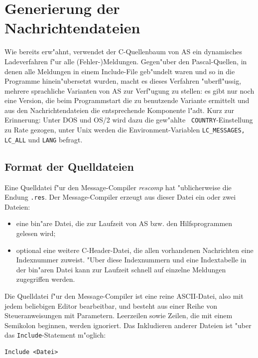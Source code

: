 \documentclass[12pt,a4paper,twoside]{report}
\newcommand{\asname}{AS}
\begin{document}

\section{Generierung der Nachrichtendateien}

Wie bereits erw"ahnt, verwendet der C-Quellenbaum von \asname{} ein dynamisches
Ladeverfahren f"ur alle (Fehler-)Meldungen.  Gegen"uber den
Pascal-Quellen, in denen alle Meldungen in einem Include-File geb"undelt
waren und so in die Programme hinein"ubersetzt wurden, macht es dieses
Verfahren "uberfl"ussig, mehrere sprachliche Varianten von \asname{} zur
Verf"ugung zu stellen: es gibt nur noch eine Version, die beim
Programmstart die zu benutzende Variante ermittelt und aus den
Nachrichtendateien die entsprechende Komponente l"adt.  Kurz zur
Erinnerung: Unter DOS und OS/2 wird dazu die gew"ahlte {\tt
COUNTRY}-Einstellung zu Rate gezogen, unter Unix werden die
Environment-Variablen {\tt LC\_MESSAGES, LC\_ALL} und {\tt LANG} befragt.

\subsection{Format der Quelldateien}

Eine Quelldatei f"ur den Message-Compiler {\em rescomp} hat "ublicherweise
die Endung {\tt .res}.  Der Message-Compiler erzeugt aus dieser Datei ein
oder zwei Dateien:
\begin{itemize}
\item{eine bin"are Datei, die zur Laufzeit von \asname{} bzw. den Hilfsprogrammen
      gelesen wird;}
\item{optional eine weitere C-Header-Datei, die allen vorhandenen
      Nachrichten eine Indexnummer zuweist.  "Uber diese Indexnummern und
      eine Indextabelle in der bin"aren Datei kann zur Laufzeit schnell
      auf einzelne Meldungen zugegriffen werden.}
\end{itemize}

Die Quelldatei f"ur den Message-Compiler ist eine reine ASCII-Datei, also
mit jedem beliebigen Editor bearbeitbar, und besteht aus einer Reihe von
Steueranweisungen mit Parametern.  Leerzeilen sowie Zeilen, die mit einem
Semikolon beginnen, werden ignoriert.  Das Inkludieren anderer Dateien ist
"uber das {\tt Include}-Statement m"oglich:
\begin{verbatim}
Include <Datei>
\end{verbatim}
\end{document}
